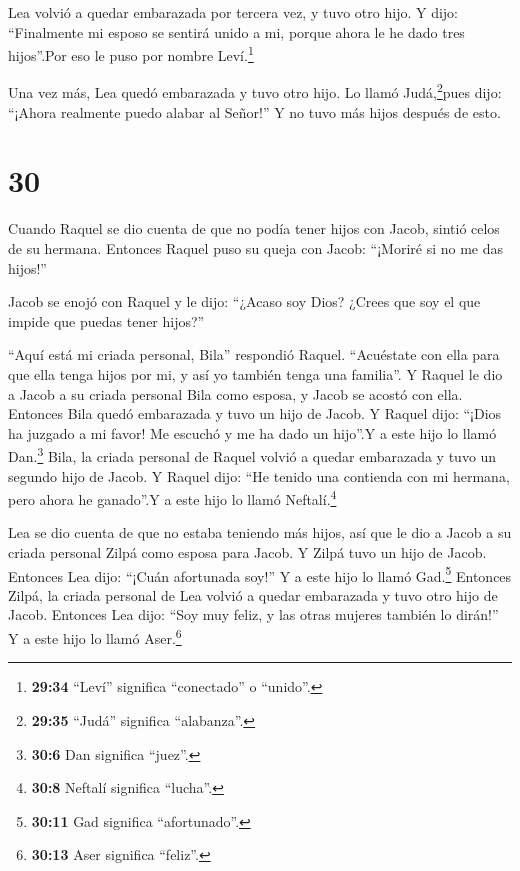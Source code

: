  Lea volvió a quedar embarazada por tercera vez, y tuvo
otro hijo. Y dijo: ``Finalmente mi esposo se sentirá unido a mi, porque
ahora le he dado tres hijos''.Por eso le puso por nombre
Leví.\footnote{\textbf{29:34} ``Leví'' significa ``conectado'' o
  ``unido''.}

 Una vez más, Lea quedó embarazada y tuvo otro hijo. Lo
llamó Judá,\footnote{\textbf{29:35} ``Judá'' significa ``alabanza''.}pues
dijo: ``¡Ahora realmente puedo alabar al Señor!'' Y no tuvo más hijos
después de esto.

\hypertarget{section-29}{%
\section{30}\label{section-29}}

 Cuando Raquel se dio cuenta de que no podía tener hijos con
Jacob, sintió celos de su hermana. Entonces Raquel puso su queja con
Jacob: ``¡Moriré si no me das hijos!''

 Jacob se enojó con Raquel y le dijo: ``¿Acaso soy Dios?
¿Crees que soy el que impide que puedas tener hijos?''

 ``Aquí está mi criada personal, Bila'' respondió Raquel.
``Acuéstate con ella para que ella tenga hijos por mi, y así yo también
tenga una familia''.  Y Raquel le dio a Jacob a su criada
personal Bila como esposa, y Jacob se acostó con ella. 
Entonces Bila quedó embarazada y tuvo un hijo de Jacob.  Y
Raquel dijo: ``¡Dios ha juzgado a mi favor! Me escuchó y me ha dado un
hijo''.Y a este hijo lo llamó Dan.\footnote{\textbf{30:6} Dan significa
  ``juez''.}  Bila, la criada personal de Raquel volvió a
quedar embarazada y tuvo un segundo hijo de Jacob.  Y Raquel
dijo: ``He tenido una contienda con mi hermana, pero ahora he ganado''.Y
a este hijo lo llamó Neftalí.\footnote{\textbf{30:8} Neftalí significa
  ``lucha''.}

 Lea se dio cuenta de que no estaba teniendo más hijos, así
que le dio a Jacob a su criada personal Zilpá como esposa para Jacob.
 Y Zilpá tuvo un hijo de Jacob.  Entonces Lea
dijo: ``¡Cuán afortunada soy!'' Y a este hijo lo llamó Gad.\footnote{\textbf{30:11}
  Gad significa ``afortunado''.}  Entonces Zilpá, la criada
personal de Lea volvió a quedar embarazada y tuvo otro hijo de Jacob.
 Entonces Lea dijo: ``Soy muy feliz, y las otras mujeres
también lo dirán!'' Y a este hijo lo llamó Aser.\footnote{\textbf{30:13}
  Aser significa ``feliz''.}

